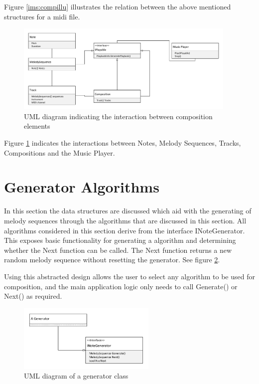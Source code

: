 Figure \ref{ims:compillu} illustrates the relation between the above mentioned structures for a midi file.

\begin{figure}
\centerline{\includegraphics[width=400px]{../images/uml_notes.pdf}}
\caption{UML diagram indicating the interaction between composition elements}
\label{ims:uml_notes}
\end{figure}

Figure \ref{ims:uml_notes} indicates the interactions between Notes, Melody Sequences, Tracks, Compositions and the Music Player.

\section{Generator Algorithms}
In this section the data structures are discussed which aid with the generating of melody sequences through the algorithms that are discussed in this section. 
All algorithms considered in this section derive from the interface INoteGenerator. This exposes basic functionality for generating a algorithm and determining whether the Next function can be called. The Next function returns a new random melody sequence without resetting the generator. See figure \ref{ims:uml_generator}.

Using this abstracted design allows the user to select any algorithm to be used for composition, and the main application logic only needs to call Generate() or Next() as required.

\begin{figure}
\centerline{\includegraphics[width=250px]{../images/uml_generator.pdf}}
\caption{UML diagram of a generator class}
\label{ims:uml_generator}
\end{figure}

